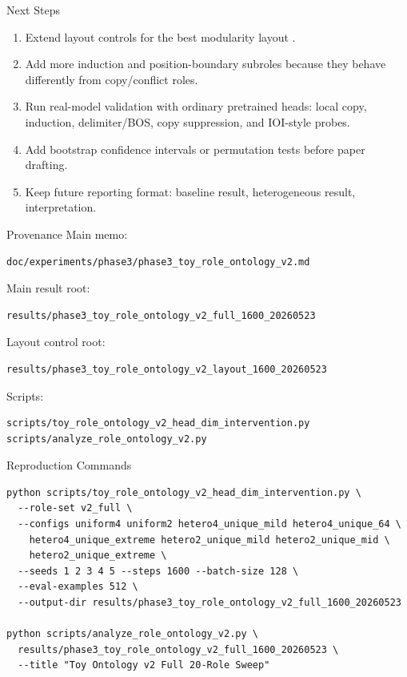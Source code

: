\documentclass[aspectratio=169]{beamer}
\newcommand{\dims}[1]{{\texttt{\detokenize{#1}}}}
\begin{document}
\begin{frame}{Next Steps}
  \small
  \begin{enumerate}
    \item Extend layout controls for the best modularity layout \dims{[8,16,64,40]}.
    \item Add more induction and position-boundary subroles because they behave differently from copy/conflict roles.
    \item Run real-model validation with ordinary pretrained heads: local copy, induction, delimiter/BOS, copy suppression, and IOI-style probes.
    \item Add bootstrap confidence intervals or permutation tests before paper drafting.
    \item Keep future reporting format: baseline result, heterogeneous result, interpretation.
  \end{enumerate}
\end{frame}

\begin{frame}[fragile]{Provenance}
  \scriptsize
  Main memo:
  \begin{verbatim}
doc/experiments/phase3/phase3_toy_role_ontology_v2.md
  \end{verbatim}
  Main result root:
  \begin{verbatim}
results/phase3_toy_role_ontology_v2_full_1600_20260523
  \end{verbatim}
  Layout control root:
  \begin{verbatim}
results/phase3_toy_role_ontology_v2_layout_1600_20260523
  \end{verbatim}
  Scripts:
  \begin{verbatim}
scripts/toy_role_ontology_v2_head_dim_intervention.py
scripts/analyze_role_ontology_v2.py
  \end{verbatim}
\end{frame}

\begin{frame}[fragile]{Reproduction Commands}
  \tiny
  \begin{verbatim}
python scripts/toy_role_ontology_v2_head_dim_intervention.py \
  --role-set v2_full \
  --configs uniform4 uniform2 hetero4_unique_mild hetero4_unique_64 \
    hetero4_unique_extreme hetero2_unique_mild hetero2_unique_mid \
    hetero2_unique_extreme \
  --seeds 1 2 3 4 5 --steps 1600 --batch-size 128 \
  --eval-examples 512 \
  --output-dir results/phase3_toy_role_ontology_v2_full_1600_20260523

python scripts/analyze_role_ontology_v2.py \
  results/phase3_toy_role_ontology_v2_full_1600_20260523 \
  --title "Toy Ontology v2 Full 20-Role Sweep"
  \end{verbatim}
\end{frame}
\end{document}
